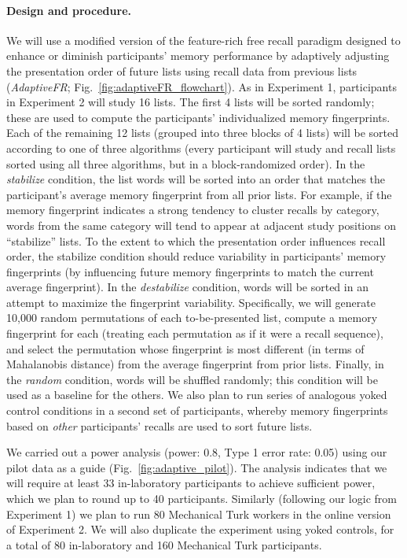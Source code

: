 \paragraph{Design and procedure.} We will use a modified version of the feature-rich free recall paradigm designed to enhance or diminish participants' memory performance by adaptively adjusting the presentation order of future lists using recall data from previous lists (\textit{AdaptiveFR}; Fig.~\ref{fig:adaptiveFR_flowchart}).  As in Experiment 1, participants in Experiment 2 will study 16 lists.  The first 4 lists will be sorted randomly; these are used to compute the participants' individualized memory fingerprints.  Each of the remaining 12 lists (grouped into three blocks of 4 lists) will be sorted according to one of three algorithms (every participant will study and recall lists sorted using all three algorithms, but in a block-randomized order).   In the \textit{stabilize} condition, the list words will be sorted into an order that matches the participant's average memory fingerprint from all prior lists.  For example, if the memory fingerprint indicates a strong tendency to cluster recalls by category, words from the same category will tend to appear at adjacent study positions on ``stabilize'' lists.  To the extent to which the presentation order influences recall order, the stabilize condition should reduce variability in participants' memory fingerprints (by influencing future memory fingerprints to match the current average fingerprint). In the \textit{destabilize} condition, words will be sorted in an attempt to maximize the fingerprint variability.  Specifically, we will generate 10,000 random permutations of each to-be-presented list, compute a memory fingerprint for each (treating each permutation as if it were a recall sequence), and select the permutation whose fingerprint is most different (in terms of Mahalanobis distance) from the average fingerprint from prior lists.  Finally, in the \textit{random} condition, words will be shuffled randomly; this condition will be used as a baseline for the others.  We also plan to run series of analogous yoked control conditions in a second set of participants, whereby memory fingerprints based on \textit{other} participants' recalls are used to sort future lists.



We carried out a power analysis (power: 0.8, Type 1 error rate: 0.05) using our pilot data as a guide (Fig.~\ref{fig:adaptive_pilot}).  The analysis indicates that we will require at least 33 in-laboratory participants to achieve sufficient power, which we plan to round up to 40 participants.  Similarly (following our logic from Experiment 1) we plan to run 80 Mechanical Turk workers in the online version of Experiment 2.  We will also duplicate the experiment using yoked controls, for a total of 80 in-laboratory and 160 Mechanical Turk participants.



